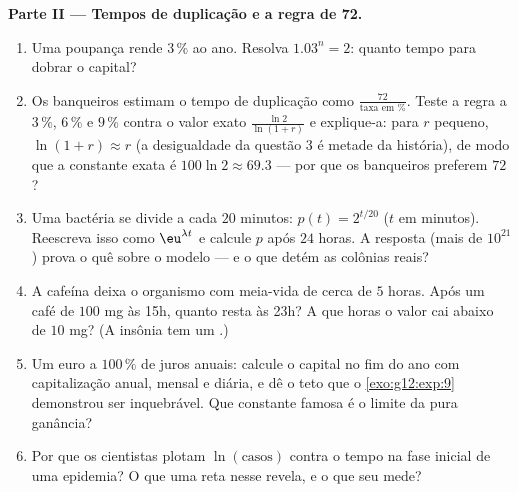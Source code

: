 \begin{problem}
\medskip
\noindent\textbf{Parte II --- Tempos de duplicação e a regra de
72.}
\begin{enumerate}[resume]
  \item Uma poupança rende $3\,\%$ ao ano. Resolva
        $1.03^n = 2$: quanto tempo para dobrar o capital?
  \item Os banqueiros estimam o tempo de duplicação como
        $\frac{72}{\text{taxa em }\%}$. Teste a regra a
        $3\,\%$, $6\,\%$ e $9\,\%$ contra o valor exato
        $\frac{\ln 2}{\ln(1 + r)}$ e explique-a: para $r$
        pequeno, $\ln(1 + r) \approx r$ (a desigualdade da
        questão 3 é metade da história), de modo que a constante
        exata é $100 \ln 2 \approx 69.3$ --- por que os
        banqueiros preferem $72$?
  \item Uma bactéria se divide a cada $20$ minutos:
        $p(t) = 2^{t/20}$ ($t$ em minutos). Reescreva isso como
        $\eu^{\lambda t}$ e calcule $p$ após $24$ horas. A
        resposta (mais de $10^{21}$) prova o quê sobre o modelo
        --- e o que detém as colônias reais?
  \item A cafeína deixa o organismo com meia-vida de cerca de
        $5$ horas. Após um café de $100$ mg às 15h, quanto resta
        às 23h? A que horas o valor cai abaixo de $10$ mg? (A
        insônia tem um .)
  \item Um euro a $100\,\%$ de juros anuais: calcule o capital no
        fim do ano com capitalização anual, mensal e diária, e dê
        o teto que o \cref{exo:g12:exp:9} demonstrou ser
        inquebrável. Que constante famosa é o limite da pura
        ganância?
  \item Por que os cientistas plotam $\ln(\text{casos})$ contra o
        tempo na fase inicial de uma epidemia? O que uma reta
        nesse  revela, e o que seu 
        mede?
\end{enumerate}


\end{problem}
